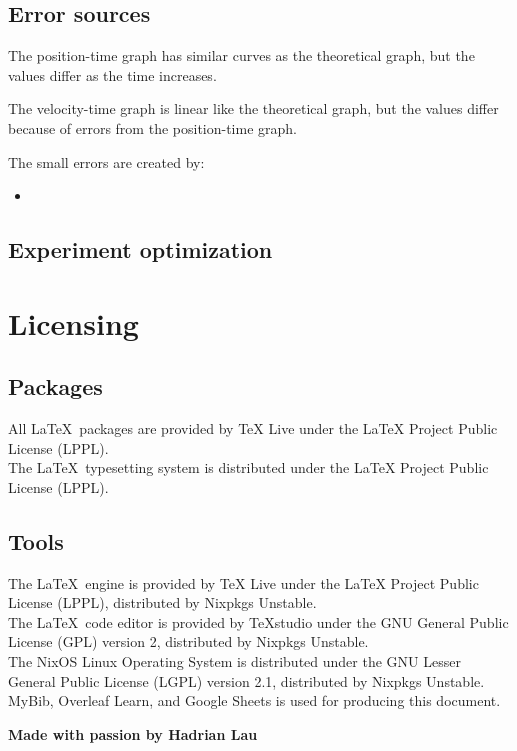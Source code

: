 \documentclass[a4paper,12pt]{article}
\begin{document}
	\subsection{Error sources}
	The position-time graph has similar curves as the theoretical graph, but the values differ as the time increases.
	
	The velocity-time graph is linear like the theoretical graph, but the values differ because of errors from the position-time graph. 
	
	The small errors are created by:
	\begin{itemize}
		\item 
	\end{itemize}
	
	\subsection{Experiment optimization}
	
	\newpage
	
	
	
	
	\section{Licensing}
	\subsection{Packages}
	All \LaTeX\, packages are provided by TeX Live under the LaTeX Project Public License (LPPL).\\
	
	The \LaTeX\, typesetting system is distributed under the LaTeX Project Public License (LPPL).\\
	
	\subsection{Tools}
	The \LaTeX\, engine is provided by TeX Live under the LaTeX Project Public License (LPPL), distributed by Nixpkgs Unstable.\\
	
	The \LaTeX\, code editor is provided by TeXstudio under the GNU General Public License (GPL) version 2, distributed by Nixpkgs Unstable.\\
	
	The NixOS Linux Operating System is distributed under the GNU Lesser General Public License (LGPL) version 2.1, distributed by Nixpkgs Unstable.\\
	
	MyBib, Overleaf Learn, and Google Sheets is used for producing this document. 
	\bigskip
	\bigskip
	\begin{center}
		\textbf{Made with passion by Hadrian Lau}
	\end{center}
	
\end{document}
